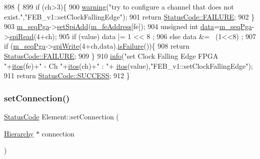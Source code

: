 \begin{DoxyCode}
898                                                                   \{
899   \textcolor{keywordflow}{if} (ch>3)\{
900     \hyperlink{classObject_a65cd4fda577711660821fd2cd5a3b4c9}{warning}(\textcolor{stringliteral}{"try to configure a channel that does not exist."},\textcolor{stringliteral}{"FEB\_v1::setClockFallingEdge"});
901     \textcolor{keywordflow}{return} \hyperlink{classStatusCode_a6f565cbeadc76d14c72f047e5e85eb4ba3da73d4c469762eb9d3c960368252b26}{StatusCode::FAILURE};
902   \}
903   \hyperlink{classFEB__v1_a6c7804ac86796f233a8393043adf2e77}{m\_seqPga}->\hyperlink{classSeqPGA_ac998ce3a6d9b5f2e88cc8393f8c1df53}{setSpiAdd}(\hyperlink{classFEB__v1_a4e1945c2d5b434125f375e9d0fc6d99f}{m\_feAddress}[fe]);
904   \textcolor{keywordtype}{unsigned} \textcolor{keywordtype}{int} \hyperlink{classFEB__v1_a6bca4320bd3bbbc32efc81097f33421a}{data}=\hyperlink{classFEB__v1_a6c7804ac86796f233a8393043adf2e77}{m\_seqPga}->\hyperlink{classSeqPGA_ab3d0e5e5d4014bc7a92588a76b8713d4}{spiRead}(4+ch);
905   \textcolor{keywordflow}{if} (value)  data |= 1 << 8  ;
906   \textcolor{keywordflow}{else}        data &= ~(1<<8) ;
907   \textcolor{keywordflow}{if} (\hyperlink{classFEB__v1_a6c7804ac86796f233a8393043adf2e77}{m\_seqPga}->\hyperlink{classSeqPGA_ad4421841ce4ce8b88ad13f63216f0743}{spiWrite}(4+ch,data).\hyperlink{classStatusCode_a5dd22dc6eb2c52fc4cabc58f6dea2eb7}{isFailure}())\{
908     \textcolor{keywordflow}{return} \hyperlink{classStatusCode_a6f565cbeadc76d14c72f047e5e85eb4ba3da73d4c469762eb9d3c960368252b26}{StatusCode::FAILURE};
909   \}
910   \hyperlink{classObject_a644fd329ea4cb85f54fa6846484b84a8}{info}(\textcolor{stringliteral}{"set Clock Falling Edge FPGA "}+\hyperlink{Tools_8h_af330027dbdafb9a30768b3613c553e60}{itos}(fe)+\textcolor{stringliteral}{" - Ch "}+\hyperlink{Tools_8h_af330027dbdafb9a30768b3613c553e60}{itos}(ch)+\textcolor{stringliteral}{" : "}+
      \hyperlink{Tools_8h_af330027dbdafb9a30768b3613c553e60}{itos}(value),\textcolor{stringliteral}{"FEB\_v1::setClockFallingEdge"});
911   \textcolor{keywordflow}{return} \hyperlink{classStatusCode_a6f565cbeadc76d14c72f047e5e85eb4badd0da38d3ba0d922efd1f4619bc37ad8}{StatusCode::SUCCESS};
912 \}
\end{DoxyCode}
\mbox{\label{classElement_ab476b4b1df5954141ceb14f072433b89}} 
\subsubsection{\texorpdfstring{set\+Connection()}{setConnection()}}
{\footnotesize\ttfamily \hyperlink{classStatusCode}{Status\+Code} Element\+::set\+Connection (\begin{DoxyParamCaption}\item[{\hyperlink{classHierarchy}{Hierarchy} $\ast$}]{connection }\end{DoxyParamCaption})\hspace{0.3cm}{\ttfamily [inherited]}}

